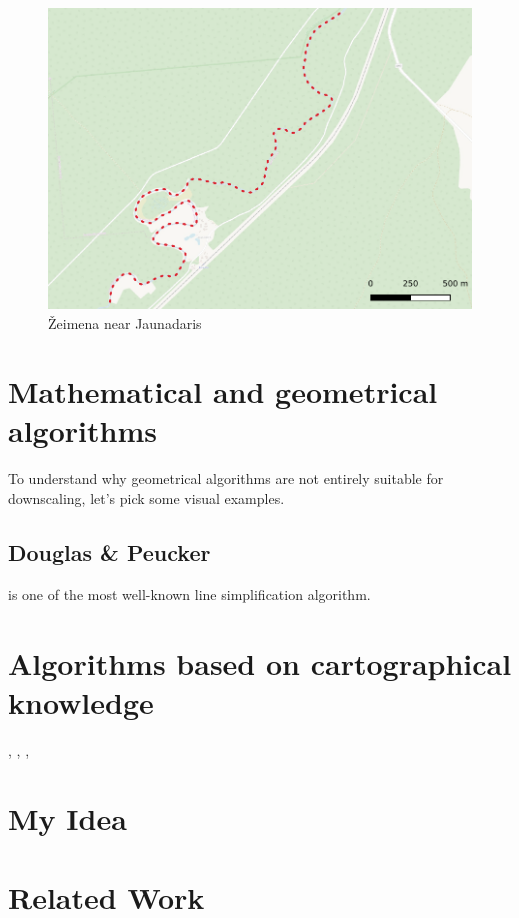 \documentclass{article}
\begin{document}
\begin{figure}
    \centering
    \includegraphics[width=\textwidth]{zeimena}
    \caption{Žeimena near Jaunadaris}
    \label{fig:zeimena}
\end{figure}

\section{Mathematical and geometrical algorithms}

To understand why geometrical algorithms are not entirely suitable for 
downscaling, let's pick some visual examples.

\subsection{Douglas \& Peucker}

\cite{douglas1973algorithms} is one of the most well-known line simplification algorithm.


\section{Algorithms based on cartographical knowledge}

\cite{jiang2003line}, \cite{dyken2009simultaneous},
\cite{mustafa2006dynamic}, \cite{nollenburg2008morphing}

\section{My Idea}
\label{sec:my_idea}

\section{Related Work}
\label{sec:related_work}
\end{document}

